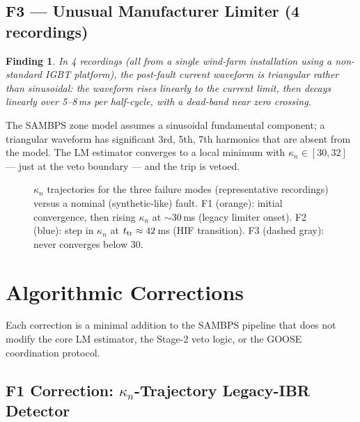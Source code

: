 \documentclass[journal]{IEEEtran}
\newtheorem{finding}{Finding}
\newcommand{\kappan}{\kappa_{n}}
\begin{document}
\subsection{F3 — Unusual Manufacturer Limiter (4 recordings)}

\begin{finding}
In 4 recordings (all from a single wind-farm installation using a
non-standard IGBT platform), the post-fault current waveform is
triangular rather than sinusoidal: the waveform rises linearly to the
current limit, then decays linearly over 5--8\,ms per half-cycle, with
a dead-band near zero crossing.
\end{finding}

The SAMBPS zone model assumes a sinusoidal fundamental component;
a triangular waveform has significant 3rd, 5th, 7th harmonics that
are absent from the model.  The LM estimator converges to a local
minimum with $\kappan \in [30, 32]$ — just at the veto boundary —
and the trip is vetoed.

\begin{figure}[htbp]
  \centering
  
  \caption{$\kappan$ trajectories for the three failure modes (representative
  recordings) versus a nominal (synthetic-like) fault.  F1 (orange): initial
  convergence, then rising $\kappan$ at $\sim$30\,ms (legacy limiter onset).
  F2 (blue): step in $\kappan$ at $t_{\rm tr} \approx 42$\,ms (HIF transition).
  F3 (dashed gray): never converges below 30.}
  \label{fig:kappa}
\end{figure}

\section{Algorithmic Corrections}
\label{sec:corrections}

Each correction is a minimal addition to the SAMBPS pipeline that does
not modify the core LM estimator, the Stage-2 veto logic, or the GOOSE
coordination protocol.

\subsection{F1 Correction: $\kappan$-Trajectory Legacy-IBR Detector}
\end{document}

